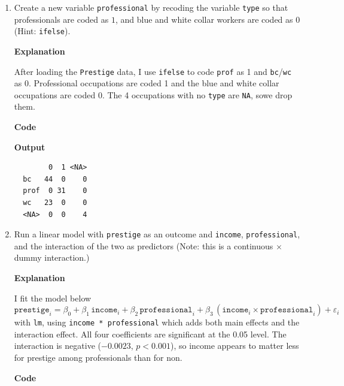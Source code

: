 \documentclass[12pt,letterpaper]{article}
\begin{document}
\newpage
\begin{enumerate}
	
	\item [(a)]
	Create a new variable \texttt{professional} by recoding the variable \texttt{type} so that professionals are coded as $1$, and blue and white collar workers are coded as $0$ (Hint: \texttt{ifelse}).
	\vspace{.5cm}

	\textbf{Explanation}
	\vspace{.5cm}

	After loading the \texttt{Prestige} data, I use \texttt{ifelse} to code \texttt{prof} as 1 and \texttt{bc}/\texttt{wc} as 0. Professional occupations are coded 1 and the blue and white collar occupations are coded 0. The 4 occupations with no \texttt{type} are \texttt{NA}, sowe drop them.
	\vspace{1cm}

	\textbf{Code}
	
	\vspace{1cm}
	\textbf{Output}
	\begin{verbatim}
        0  1 <NA>
  bc   44  0    0
  prof  0 31    0
  wc   23  0    0
  <NA>  0  0    4
	\end{verbatim}

	\vspace{6cm}
	
	
	\item [(b)]
	Run a linear model with \texttt{prestige} as an outcome and \texttt{income}, \texttt{professional}, and the interaction of the two as predictors (Note: this is a continuous $\times$ dummy interaction.)
	\vspace{.5cm}

	\textbf{Explanation}
	\vspace{.5cm}

	I fit the model below 
	\[
	\texttt{prestige}_i = \beta_0 + \beta_1\,\texttt{income}_i + \beta_2\,\texttt{professional}_i + \beta_3\,(\texttt{income}_i \times \texttt{professional}_i) + \varepsilon_i
	\]
	with \texttt{lm}, using \texttt{income * professional} which adds both main effects and the interaction effect. All four coefficients are significant at the 0.05 level. The interaction is negative ($-0.0023$, $p < 0.001$), so income appears to matter less for prestige among professionals than for non.
	\vspace{1cm}

	\textbf{Code}
	
	\vspace{1cm}


\end{enumerate}
\end{document}
